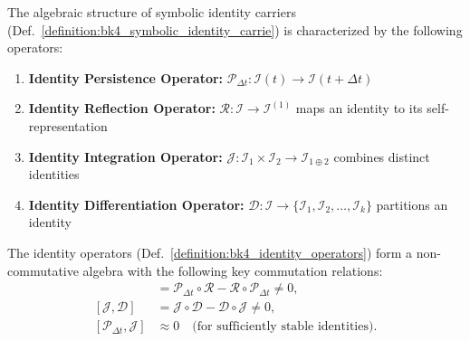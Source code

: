 \begin{definition}
\label{definition:bk4_identity_operators}
The algebraic structure of symbolic identity carriers (Def.~\ref{definition:bk4_symbolic_identity_carrie})
is characterized by the following operators:
\begin{enumerate}
    \item \textbf{Identity Persistence Operator:} $\mathcal{P}_{\Delta t}: \mathcal{I}(t) \to \mathcal{I}(t + \Delta t)$
    \item \textbf{Identity Reflection Operator:} $\mathcal{R}: \mathcal{I} \to \mathcal{I}^{(1)}$ maps an identity to its self-representation
    \item \textbf{Identity Integration Operator:} $\mathcal{J}: \mathcal{I}_1 \times \mathcal{I}_2 \to \mathcal{I}_{1 \oplus 2}$ combines distinct identities
    \item \textbf{Identity Differentiation Operator:} $\mathcal{D}: \mathcal{I} \to \{\mathcal{I}_1, \mathcal{I}_2, \ldots, \mathcal{I}_k\}$ partitions an identity
\end{enumerate}
\end{definition}
\begin{theorem}
\label{theorem:bk4_operator_algebra_of_identit}
The identity operators (Def.~\ref{definition:bk4_identity_operators}) form a non-commutative algebra with the following key commutation relations:
\begin{align}
    [\mathcal{P}_{\Delta t}, \mathcal{R}] &= \mathcal{P}_{\Delta t} \circ \mathcal{R} - \mathcal{R} \circ \mathcal{P}_{\Delta t} \neq 0, \\
    [\mathcal{J}, \mathcal{D}] &= \mathcal{J} \circ \mathcal{D} - \mathcal{D} \circ \mathcal{J} \neq 0, \\
    [\mathcal{P}_{\Delta t}, \mathcal{J}] &\approx 0 
    \quad \text{(for sufficiently stable identities)}.
\end{align}
\end{theorem}
